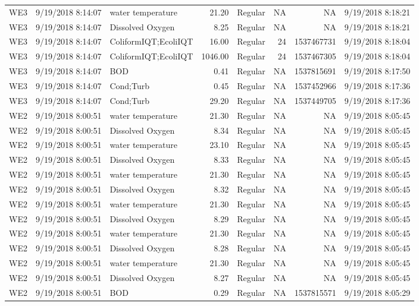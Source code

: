 \documentclass[
  letterpaper,
  DIV=11,
  numbers=noendperiod]{scrartcl}
\begin{document}
\begin{longtable*}{lrlrlrrr}
WE3 & 9/19/2018 8:14:07 & water temperature & 21.20 & Regular & NA & NA & 9/19/2018 8:18:21 \\ 
WE3 & 9/19/2018 8:14:07 & Dissolved Oxygen & 8.25 & Regular & NA & NA & 9/19/2018 8:18:21 \\ 
WE3 & 9/19/2018 8:14:07 & ColiformIQT;EcoliIQT & 16.00 & Regular & 24 & 1537467731 & 9/19/2018 8:18:04 \\ 
WE3 & 9/19/2018 8:14:07 & ColiformIQT;EcoliIQT & 1046.00 & Regular & 24 & 1537467305 & 9/19/2018 8:18:04 \\ 
WE3 & 9/19/2018 8:14:07 & BOD & 0.41 & Regular & NA & 1537815691 & 9/19/2018 8:17:50 \\ 
WE3 & 9/19/2018 8:14:07 & Cond;Turb & 0.45 & Regular & NA & 1537452966 & 9/19/2018 8:17:36 \\ 
WE3 & 9/19/2018 8:14:07 & Cond;Turb & 29.20 & Regular & NA & 1537449705 & 9/19/2018 8:17:36 \\ 
WE2 & 9/19/2018 8:00:51 & water temperature & 21.30 & Regular & NA & NA & 9/19/2018 8:05:45 \\ 
WE2 & 9/19/2018 8:00:51 & Dissolved Oxygen & 8.34 & Regular & NA & NA & 9/19/2018 8:05:45 \\ 
WE2 & 9/19/2018 8:00:51 & water temperature & 23.10 & Regular & NA & NA & 9/19/2018 8:05:45 \\ 
WE2 & 9/19/2018 8:00:51 & Dissolved Oxygen & 8.33 & Regular & NA & NA & 9/19/2018 8:05:45 \\ 
WE2 & 9/19/2018 8:00:51 & water temperature & 21.30 & Regular & NA & NA & 9/19/2018 8:05:45 \\ 
WE2 & 9/19/2018 8:00:51 & Dissolved Oxygen & 8.32 & Regular & NA & NA & 9/19/2018 8:05:45 \\ 
WE2 & 9/19/2018 8:00:51 & water temperature & 21.30 & Regular & NA & NA & 9/19/2018 8:05:45 \\ 
WE2 & 9/19/2018 8:00:51 & Dissolved Oxygen & 8.29 & Regular & NA & NA & 9/19/2018 8:05:45 \\ 
WE2 & 9/19/2018 8:00:51 & water temperature & 21.30 & Regular & NA & NA & 9/19/2018 8:05:45 \\ 
WE2 & 9/19/2018 8:00:51 & Dissolved Oxygen & 8.28 & Regular & NA & NA & 9/19/2018 8:05:45 \\ 
WE2 & 9/19/2018 8:00:51 & water temperature & 21.30 & Regular & NA & NA & 9/19/2018 8:05:45 \\ 
WE2 & 9/19/2018 8:00:51 & Dissolved Oxygen & 8.27 & Regular & NA & NA & 9/19/2018 8:05:45 \\ 
WE2 & 9/19/2018 8:00:51 & BOD & 0.29 & Regular & NA & 1537815571 & 9/19/2018 8:05:29 \\ 

\end{longtable*}
\end{document}
